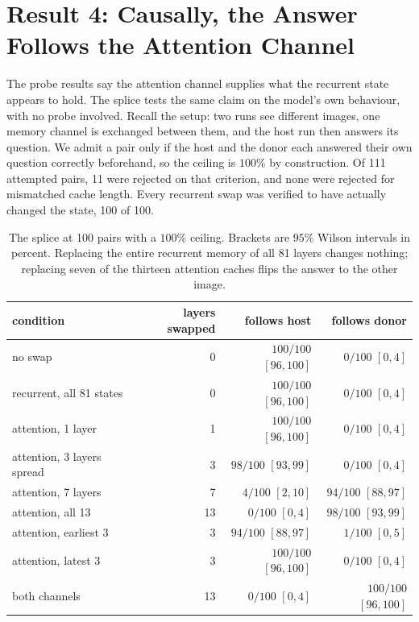 \documentclass{article}
\begin{document}
\section{Result 4: Causally, the Answer Follows the Attention Channel}

The probe results say the attention channel supplies what the recurrent state
appears to hold. The splice tests the same claim on the model's own
behaviour, with no probe involved. Recall the setup: two runs see different
images, one memory channel is exchanged between them, and the host run then
answers its question. We admit a pair only if the host and the donor each
answered their own question correctly beforehand, so the ceiling is $100\%$ by
construction. Of 111 attempted pairs, 11 were rejected on that criterion, and
none were rejected for mismatched cache length. Every recurrent swap was
verified to have actually changed the state, 100 of 100.

\begin{table}[h]
\centering\small
\begin{tabular}{lrrr}
\toprule
condition & layers swapped & follows host & follows donor \\
\midrule
no swap                       & 0  & $100/100$ $[96,100]$ & $0/100$ $[0,4]$ \\
recurrent, all 81 states      & 0  & $100/100$ $[96,100]$ & $0/100$ $[0,4]$ \\
\addlinespace
attention, 1 layer            & 1  & $100/100$ $[96,100]$ & $0/100$ $[0,4]$ \\
attention, 3 layers spread    & 3  & $98/100$ $[93,99]$   & $0/100$ $[0,4]$ \\
attention, 7 layers           & 7  & $4/100$ $[2,10]$     & $94/100$ $[88,97]$ \\
attention, all 13             & 13 & $0/100$ $[0,4]$      & $98/100$ $[93,99]$ \\
\addlinespace
attention, earliest 3         & 3  & $94/100$ $[88,97]$   & $1/100$ $[0,5]$ \\
attention, latest 3           & 3  & $100/100$ $[96,100]$ & $0/100$ $[0,4]$ \\
both channels                 & 13 & $0/100$ $[0,4]$      & $100/100$ $[96,100]$ \\
\bottomrule
\end{tabular}
\caption{The splice at 100 pairs with a $100\%$ ceiling. Brackets are $95\%$
Wilson intervals in percent. Replacing the entire recurrent memory of all 81
layers changes nothing; replacing seven of the thirteen attention caches flips
the answer to the other image.}
\label{tab:splice}
\end{table}
\end{document}

